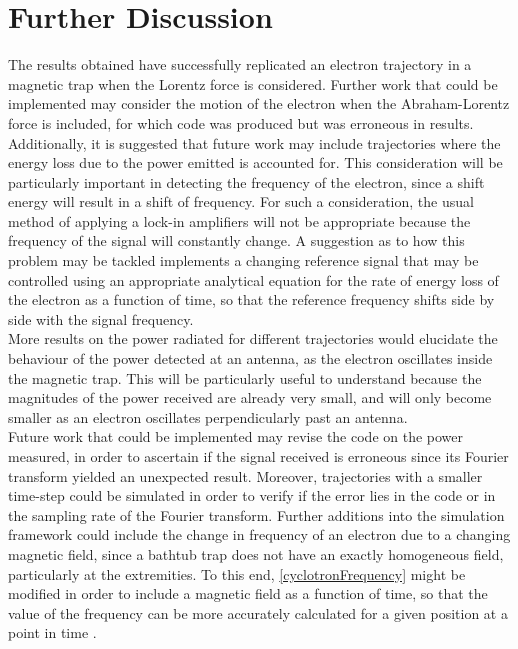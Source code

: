 \documentclass[a4paper,12pt, notitlepage]{article}
\begin{document}
\section{Further Discussion}
The results obtained have successfully replicated an electron trajectory in a magnetic trap when the Lorentz force is considered. Further work that could be implemented may consider the motion of the electron when the Abraham-Lorentz force is included, for which code was produced but was erroneous in results. Additionally, it is suggested that future work may include trajectories where the energy loss due to the power emitted is accounted for. This consideration will be particularly important in detecting the frequency of the electron, since a shift energy will result in a shift of frequency. For such a consideration, the usual method of applying a lock-in amplifiers will not be appropriate because the frequency of the signal will constantly change. A suggestion as to how this problem may be tackled implements a changing reference signal that may be controlled using an appropriate analytical equation for the rate of energy loss of the electron as a function of time, so that the reference frequency shifts side by side with the signal frequency. \\
More results on the power radiated for different trajectories would elucidate the behaviour of the power detected at an antenna, as the electron oscillates inside the magnetic trap. This will be particularly useful to understand because the magnitudes of the power received are already very small, and will only become smaller as an electron oscillates perpendicularly past an antenna. \\
Future work that could be implemented may revise the code on the power measured, in order to ascertain if the signal received is erroneous since its Fourier transform yielded an unexpected result. Moreover, trajectories with a smaller time-step could be simulated in order to verify if the error lies in the code or in the sampling rate of the Fourier transform.
Further additions into the simulation framework could include the change in frequency of an electron due to a changing magnetic field, since a bathtub trap does not have an exactly homogeneous field, particularly at the extremities. To this end, \cref{cyclotronFrequency} might be modified in order to include a magnetic field as a function of time, so that the value of the frequency can be more accurately calculated for a given position at a point in time \cite{Ashtari2019}. \\


\printbibliography
\end{document}
